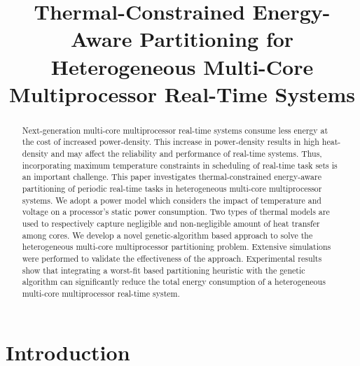 \documentclass[conference]{IEEEtran}
\begin{document}
\title{\LARGE Thermal-Constrained Energy-Aware Partitioning for Heterogeneous Multi-Core Multiprocessor Real-Time Systems}

\author{
 }


\maketitle


\begin{abstract}
Next-generation multi-core multiprocessor real-time systems consume less energy at the cost of increased power-density.
This increase in power-density results in high
heat-density and may affect the reliability and performance of real-time systems. Thus, incorporating maximum temperature
constraints in scheduling of real-time task sets is an important challenge.
This paper investigates thermal-constrained energy-aware %
partitioning of periodic real-time tasks in heterogeneous multi-core
multiprocessor systems. We adopt a power model which considers the impact of temperature and voltage on a processor's static power consumption.
Two types of thermal models are used to respectively capture negligible and non-negligible amount of heat
transfer among cores. %
We develop a novel genetic-algorithm based approach to solve the heterogeneous multi-core multiprocessor partitioning problem.
Extensive simulations were performed to validate the effectiveness of the approach.
Experimental results show that integrating a worst-fit based partitioning heuristic with the genetic algorithm %
can significantly
reduce the  total energy consumption of a heterogeneous multi-core multiprocessor real-time system.
\end{abstract}

\vspace{-0.1in}

\section{Introduction}
\end{document}
